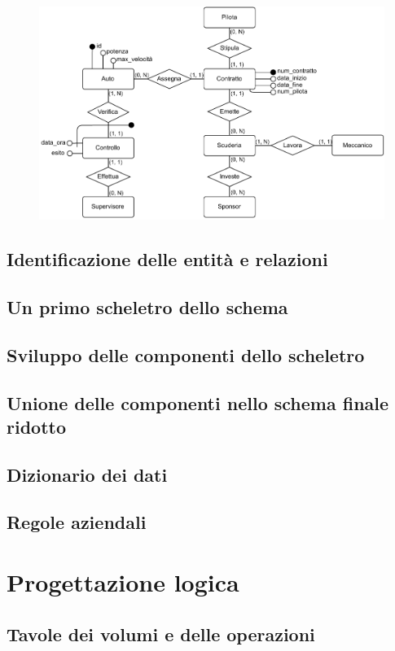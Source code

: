 \documentclass[11pt]{article}
\begin{document}
\begin{figure}[H]
    \centering
    \includegraphics[width=15.5cm]{../er/gare_scuderie.pdf}
\end{figure}

\subsection{Identificazione delle entità e relazioni}
\subsection{Un primo scheletro dello schema}
\subsection{Sviluppo delle componenti dello scheletro}
\subsection{Unione delle componenti nello schema finale ridotto}
\subsection{Dizionario dei dati}
\subsection{Regole aziendali}

\section{Progettazione logica}
\subsection{Tavole dei volumi e delle operazioni}
\end{document}
